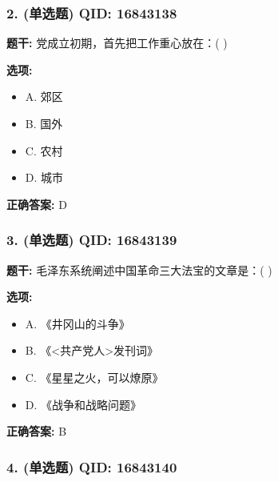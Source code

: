 \documentclass[12pt,UTF8]{ctexart}
\begin{document}
\subsubsection*{2. (单选题) \small QID: 16843138}

\textbf{题干:}
党成立初期，首先把工作重心放在：( )

\textbf{选项:}
\begin{itemize}[leftmargin=*]

  \item A. 郊区

  \item B. 国外

  \item C. 农村

  \item D. 城市

\end{itemize}

\textbf{正确答案:}
D

\vspace{0.3em}\hrulefill\vspace{0.7em}

\subsubsection*{3. (单选题) \small QID: 16843139}

\textbf{题干:}
毛泽东系统阐述中国革命三大法宝的文章是：( )

\textbf{选项:}
\begin{itemize}[leftmargin=*]

  \item A. 《井冈山的斗争》

  \item B. 《<共产党人>发刊词》

  \item C. 《星星之火，可以燎原》

  \item D. 《战争和战略问题》

\end{itemize}

\textbf{正确答案:}
B

\vspace{0.3em}\hrulefill\vspace{0.7em}

\subsubsection*{4. (单选题) \small QID: 16843140}
\end{document}
